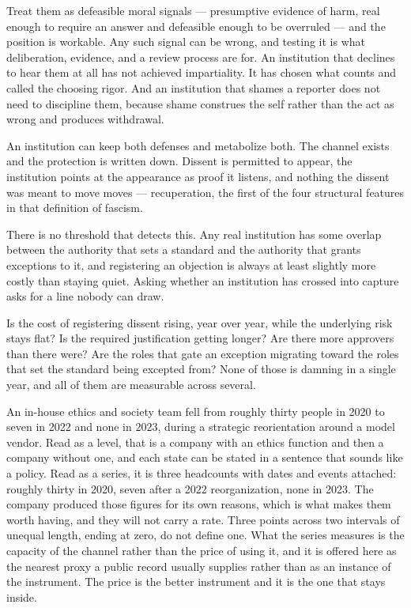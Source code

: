 Treat them as defeasible moral signals — presumptive evidence of harm, real enough to require an answer and defeasible enough to be overruled — and the position is workable. Any such signal can be wrong, and testing it is what deliberation, evidence, and a review process are for. An institution that declines to hear them at all has not achieved impartiality. It has chosen what counts and called the choosing rigor. And an institution that shames a reporter does not need to discipline them, because shame construes the self rather than the act as wrong and produces withdrawal.

An institution can keep both defenses and metabolize both. The channel exists and the protection is written down. Dissent is permitted to appear, the institution points at the appearance as proof it listens, and nothing the dissent was meant to move moves — recuperation, the first of the four structural features in that definition of fascism.

There is no threshold that detects this. Any real institution has some overlap between the authority that sets a standard and the authority that grants exceptions to it, and registering an objection is always at least slightly more costly than staying quiet. Asking whether an institution has crossed into capture asks for a line nobody can draw.

Is the cost of registering dissent rising, year over year, while the underlying risk stays flat? Is the required justification getting longer? Are there more approvers than there were? Are the roles that gate an exception migrating toward the roles that set the standard being excepted from? None of those is damning in a single year, and all of them are measurable across several.

An in-house ethics and society team fell from roughly thirty people in 2020 to seven in 2022 and none in 2023, during a strategic reorientation around a model vendor. Read as a level, that is a company with an ethics function and then a company without one, and each state can be stated in a sentence that sounds like a policy. Read as a series, it is three headcounts with dates and events attached: roughly thirty in 2020, seven after a 2022 reorganization, none in 2023. The company produced those figures for its own reasons, which is what makes them worth having, and they will not carry a rate. Three points across two intervals of unequal length, ending at zero, do not define one. What the series measures is the capacity of the channel rather than the price of using it, and it is offered here as the nearest proxy a public record usually supplies rather than as an instance of the instrument. The price is the better instrument and it is the one that stays inside.

